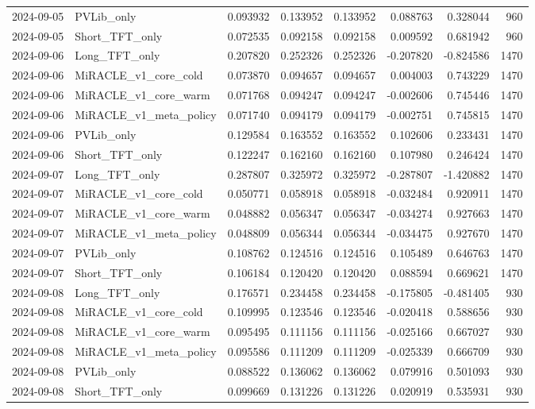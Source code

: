 \begin{tabular}{llrrrrrr}
2024-09-05 & PVLib_only & 0.093932 & 0.133952 & 0.133952 & 0.088763 & 0.328044 & 960 \\
2024-09-05 & Short_TFT_only & 0.072535 & 0.092158 & 0.092158 & 0.009592 & 0.681942 & 960 \\
2024-09-06 & Long_TFT_only & 0.207820 & 0.252326 & 0.252326 & -0.207820 & -0.824586 & 1470 \\
2024-09-06 & MiRACLE_v1_core_cold & 0.073870 & 0.094657 & 0.094657 & 0.004003 & 0.743229 & 1470 \\
2024-09-06 & MiRACLE_v1_core_warm & 0.071768 & 0.094247 & 0.094247 & -0.002606 & 0.745446 & 1470 \\
2024-09-06 & MiRACLE_v1_meta_policy & 0.071740 & 0.094179 & 0.094179 & -0.002751 & 0.745815 & 1470 \\
2024-09-06 & PVLib_only & 0.129584 & 0.163552 & 0.163552 & 0.102606 & 0.233431 & 1470 \\
2024-09-06 & Short_TFT_only & 0.122247 & 0.162160 & 0.162160 & 0.107980 & 0.246424 & 1470 \\
2024-09-07 & Long_TFT_only & 0.287807 & 0.325972 & 0.325972 & -0.287807 & -1.420882 & 1470 \\
2024-09-07 & MiRACLE_v1_core_cold & 0.050771 & 0.058918 & 0.058918 & -0.032484 & 0.920911 & 1470 \\
2024-09-07 & MiRACLE_v1_core_warm & 0.048882 & 0.056347 & 0.056347 & -0.034274 & 0.927663 & 1470 \\
2024-09-07 & MiRACLE_v1_meta_policy & 0.048809 & 0.056344 & 0.056344 & -0.034475 & 0.927670 & 1470 \\
2024-09-07 & PVLib_only & 0.108762 & 0.124516 & 0.124516 & 0.105489 & 0.646763 & 1470 \\
2024-09-07 & Short_TFT_only & 0.106184 & 0.120420 & 0.120420 & 0.088594 & 0.669621 & 1470 \\
2024-09-08 & Long_TFT_only & 0.176571 & 0.234458 & 0.234458 & -0.175805 & -0.481405 & 930 \\
2024-09-08 & MiRACLE_v1_core_cold & 0.109995 & 0.123546 & 0.123546 & -0.020418 & 0.588656 & 930 \\
2024-09-08 & MiRACLE_v1_core_warm & 0.095495 & 0.111156 & 0.111156 & -0.025166 & 0.667027 & 930 \\
2024-09-08 & MiRACLE_v1_meta_policy & 0.095586 & 0.111209 & 0.111209 & -0.025339 & 0.666709 & 930 \\
2024-09-08 & PVLib_only & 0.088522 & 0.136062 & 0.136062 & 0.079916 & 0.501093 & 930 \\
2024-09-08 & Short_TFT_only & 0.099669 & 0.131226 & 0.131226 & 0.020919 & 0.535931 & 930 \\

\end{tabular}
